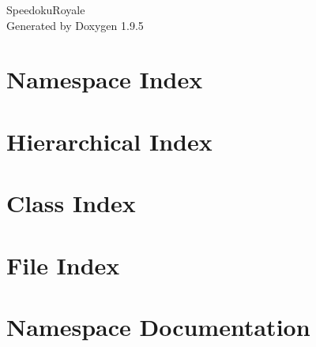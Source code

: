 \documentclass[twoside]{book}
\newcommand{\+}{\discretionary{\mbox{\scriptsize$\hookleftarrow$}}{}{}}
\newcommand{\clearemptydoublepage}{%
    \newpage{\pagestyle{empty}\cleardoublepage}%
  }
\begin{document}
  \raggedbottom
    \hypersetup{pageanchor=false,
                bookmarksnumbered=true,
                pdfencoding=unicode
               }
  \begin{titlepage}
  \vspace*{7cm}
  \begin{center}%
  {\Large Speedoku\+Royale}\\
  \vspace*{1cm}
  {\large Generated by Doxygen 1.9.5}\\
  \end{center}
  \end{titlepage}
  \clearemptydoublepage
  \tableofcontents
  \clearemptydoublepage
  \hypersetup{pageanchor=true}
\chapter{Namespace Index}

\chapter{Hierarchical Index}

\chapter{Class Index}

\chapter{File Index}

\chapter{Namespace Documentation}

\end{document}
